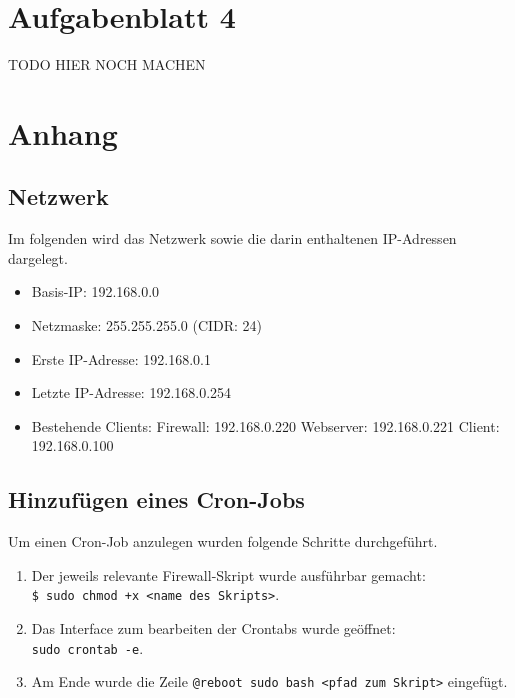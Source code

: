 \documentclass[
    a4paper,
    pagesize,
	pdftex,
    12pt,
]{scrartcl}
\begin{document}
\newpage
\section{Aufgabenblatt 4}

TODO HIER NOCH MACHEN

\newpage
\section{Anhang}

\subsection{Netzwerk}
Im folgenden wird das Netzwerk sowie die darin enthaltenen IP-Adressen dargelegt.
\begin{itemize}
	\item Basis-IP: 192.168.0.0
	\item Netzmaske: 255.255.255.0 (CIDR: 24)
	\item Erste IP-Adresse: 192.168.0.1
	\item Letzte IP-Adresse: 192.168.0.254
	\item Bestehende Clients:
		\subitem Firewall: 192.168.0.220
		\subitem Webserver: 192.168.0.221
		\subitem Client: 192.168.0.100
\end{itemize}

\subsection{Hinzufügen eines Cron-Jobs}\label{cron-job}
Um einen Cron-Job anzulegen wurden folgende Schritte durchgeführt.
\begin{enumerate}
	\item Der jeweils relevante Firewall-Skript wurde ausführbar gemacht: \\ \lstinline[breaklines]|$ sudo chmod +x <name des Skripts>|.
	\item Das Interface zum bearbeiten der Crontabs wurde geöffnet: \\ \lstinline[breaklines]|sudo crontab -e|.
	\item Am Ende wurde die Zeile \lstinline[breaklines]|@reboot sudo bash <pfad zum Skript>| eingefügt.
\end{enumerate}
\end{document}
